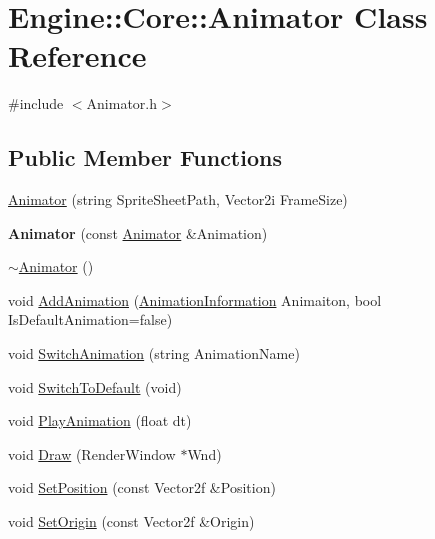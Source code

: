 \hypertarget{class_engine_1_1_core_1_1_animator}{}\section{Engine\+:\+:Core\+:\+:Animator Class Reference}
\label{class_engine_1_1_core_1_1_animator}


{\ttfamily \#include $<$Animator.\+h$>$}

\subsection*{Public Member Functions}
\begin{DoxyCompactItemize}
\item 
\hyperlink{class_engine_1_1_core_1_1_animator_aff070abc3b379dad575e88484b077dc1}{Animator} (string Sprite\+Sheet\+Path, Vector2i Frame\+Size)
\item 
\mbox{\label{class_engine_1_1_core_1_1_animator_afef975bcfc2b1ba36e10dc09b5e68556}} 
{\bfseries Animator} (const \hyperlink{class_engine_1_1_core_1_1_animator}{Animator} \&Animation)
\item 
\hyperlink{class_engine_1_1_core_1_1_animator_a5eb5382d793dc2d27b9049cb7f91aa63}{$\sim$\+Animator} ()
\item 
void \hyperlink{class_engine_1_1_core_1_1_animator_afebfde85efb9f5fafc32fa4103bb8e44}{Add\+Animation} (\hyperlink{struct_engine_1_1_core_1_1_animation_information}{Animation\+Information} Animaiton, bool Is\+Default\+Animation=false)
\item 
void \hyperlink{class_engine_1_1_core_1_1_animator_acf3e63a6bc60cde6b4b26ed4387c92cc}{Switch\+Animation} (string Animation\+Name)
\item 
void \hyperlink{class_engine_1_1_core_1_1_animator_a9d81dd25418ebaf1bcae5f88ac879f56}{Switch\+To\+Default} (void)
\item 
void \hyperlink{class_engine_1_1_core_1_1_animator_a2605b91ae769e14ab92d9a210e4b3d5c}{Play\+Animation} (float dt)
\item 
void \hyperlink{class_engine_1_1_core_1_1_animator_aefd22a2fa9e388be63a993cb7aa1875e}{Draw} (Render\+Window $\ast$Wnd)
\item 
void \hyperlink{class_engine_1_1_core_1_1_animator_a1bfe987d5417116a39a8963a8f2ab4ca}{Set\+Position} (const Vector2f \&Position)
\item 
void \hyperlink{class_engine_1_1_core_1_1_animator_ac5d217c5dd3257349dca55cd6a62b7ed}{Set\+Origin} (const Vector2f \&Origin)

\end{DoxyCompactItemize}
